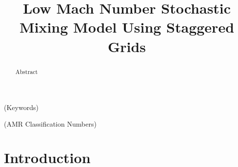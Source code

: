\documentclass[final]{siamltex}
\begin{document}
\title{Low Mach Number Stochastic Mixing Model Using Staggered Grids}

\maketitle

\begin{abstract}
Abstract
\end{abstract}

\begin{keywords}
(Keywords)
\end{keywords}

\begin{AMS}
(AMR Classification Numbers)
\end{AMS}

\section{Introduction}


\end{document}

